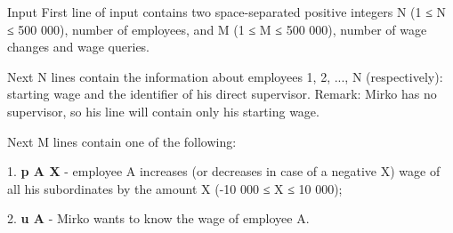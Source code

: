 Input
First line of input contains two space-separated positive integers N (1 ≤ N ≤ 500 000), number of employees, and M (1 ≤ M ≤ 500 000), number of wage changes and wage queries.




Next N lines contain the information about employees 1, 2, ..., N (respectively): starting wage and the identifier of his direct supervisor. Remark: Mirko has no supervisor, so his line will contain only his starting wage.




Next M lines contain one of the following:


1. \textbf{ p A X } - employee A increases (or decreases in case of a negative X) wage of all his subordinates by the amount X (-10 000 ≤ X ≤ 10 000);


2. \textbf{ u A } - Mirko wants to know the wage of employee A.